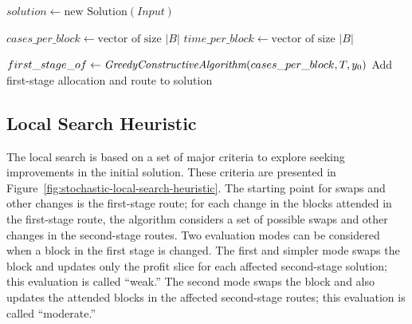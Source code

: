 \begin{algorithm}[h!]
	\caption{Create Initial Solution} \label{alg:create-initial-solution}
	\SetAlgoLined

	$solution \leftarrow \text{new Solution}(Input)$\;

	$cases\_per\_block \leftarrow \text{vector of size } |B|$\;
	$time\_per\_block \leftarrow \text{vector of size } |B|$\;


	$first\_stage\_of \leftarrow \textit{GreedyConstructiveAlgorithm}(cases\_per\_block, T, y_0)$\;
	Add first-stage allocation and route to solution\;

	\;
\end{algorithm}

\subsection{Local Search Heuristic}

The local search is based on a set of major criteria to explore seeking improvements in the initial solution. These criteria are presented in Figure~\ref{fig:stochastic-local-search-heuristic}. The starting point for swaps and other changes is the first-stage route; for each change in the blocks attended in the first-stage route, the algorithm considers a set of possible swaps and other changes in the second-stage routes.
Two evaluation modes can be considered when a block in the first stage is changed. The first and simpler mode swaps the block and updates only the profit slice for each affected second-stage solution; this evaluation is called ``weak.'' The second mode swaps the block and also updates the attended blocks in the affected second-stage routes; this evaluation is called ``moderate.''

